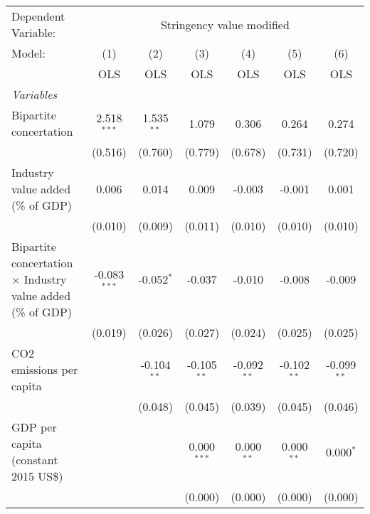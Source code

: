 
\begingroup
\centering
\begin{tabular}{lcccccc}
   \toprule
   Dependent Variable: & \multicolumn{6}{c}{Stringency value modified}\\
   Model:                                                             & (1)            & (2)           & (3)           & (4)            & (5)            & (6)\\  
                                                                      &  OLS           & OLS           & OLS           & OLS            & OLS            & OLS\\  
   \midrule
   \emph{Variables}\\
   Bipartite concertation                                             & 2.518$^{***}$  & 1.535$^{**}$  & 1.079         & 0.306          & 0.264          & 0.274\\   
                                                                      & (0.516)        & (0.760)       & (0.779)       & (0.678)        & (0.731)        & (0.720)\\   
   Industry value added (\% of GDP)                                   & 0.006          & 0.014         & 0.009         & -0.003         & -0.001         & 0.001\\   
                                                                      & (0.010)        & (0.009)       & (0.011)       & (0.010)        & (0.010)        & (0.010)\\   
   Bipartite concertation $\times$ Industry value added (\% of GDP)   & -0.083$^{***}$ & -0.052$^{*}$  & -0.037        & -0.010         & -0.008         & -0.009\\   
                                                                      & (0.019)        & (0.026)       & (0.027)       & (0.024)        & (0.025)        & (0.025)\\   
   CO2 emissions per capita                                           &                & -0.104$^{**}$ & -0.105$^{**}$ & -0.092$^{**}$  & -0.102$^{**}$  & -0.099$^{**}$\\   
                                                                      &                & (0.048)       & (0.045)       & (0.039)        & (0.045)        & (0.046)\\   
   GDP per capita (constant 2015 US\$)                                &                &               & 0.000$^{***}$ & 0.000$^{**}$   & 0.000$^{**}$   & 0.000$^{*}$\\   
                                                                      &                &               & (0.000)       & (0.000)        & (0.000)        & (0.000)\\   

\end{tabular}
